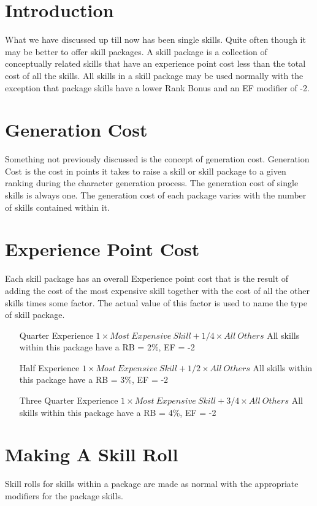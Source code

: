 \section{Introduction}
What we have discussed up till now has been single skills.
Quite often though it may be better to offer skill packages.
A skill package is a collection of conceptually related 
skills that have an experience point cost less than the total 
cost of all the skills. All skills in a skill package may be 
used normally with the exception that package skills have a lower
Rank Bonus and an EF modifier of -2. 

\section{Generation Cost}

Something not previously discussed is the concept of generation 
cost. Generation Cost is the cost in points it takes to raise a skill 
or skill package to a given ranking during the character generation 
process. The generation cost of single skills is always one. The 
generation cost of each package varies with the number of skills 
contained within it.

\section{Experience Point Cost}

Each skill package has an overall Experience point cost that is
the result of adding the cost of the most expensive skill together
with the cost of all the other skills times some factor. The actual value
of this factor is used to name the type of skill package.

\begin{itemize}
	\item[Quarter Experience] \( 1 \times Most\ Expensive\ Skill + 1/4 \times All\ Others \)
	All skills within this package have a RB = 2\%, EF = -2 
	\item[Half Experience] \( 1 \times Most\ Expensive\ Skill + 1/2 \times All\ Others \)
	All skills within this package have a RB = 3\%, EF = -2
	\item[Three Quarter Experience] \( 1 \times Most\ Expensive\ Skill + 3/4 \times All\ Others \) 
	All skills within this package have a RB = 4\%, EF = -2
\end{itemize}

\section{Making A Skill Roll}
Skill rolls for skills within a package are made as normal with the appropriate 
modifiers for the package skills.

